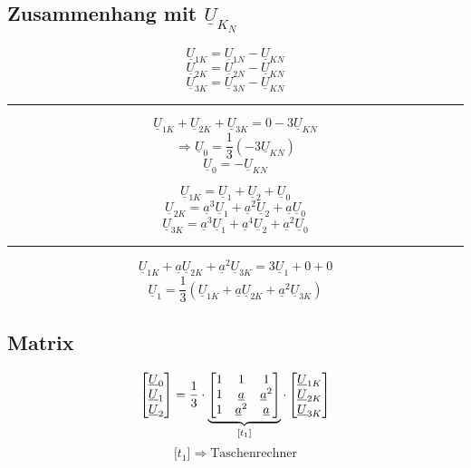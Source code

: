 \documentclass[a4,paper,fleqn]{article}
\begin{document}
\subsection{Zusammenhang mit $\underline{U}_{K_N}$}
\[ \underline{U}_{1K} = \underline{U}_{1N} - \underline{U}_{KN} \]
\[ \underline{U}_{2K} = \underline{U}_{2N} - \underline{U}_{KN} \]
\[ \underline{U}_{3K} = \underline{U}_{3N} - \underline{U}_{KN} \]
\rule{10cm}{0.5pt}
\[ \underline{U}_{1K} + \underline{U}_{2K} + \underline{U}_{3K} = 0 - 3 \underline{U}_{KN} \]
\[ \Rightarrow \underline{U}_{0} = \frac{1}{3} (-3 \underline{U}_{KN}) \]
\[ \boxed{\underline{U}_{0} = -\underline{U}_{KN}} \]

\[ \underline{U}_{1K} = \underline{U}_{1} + \underline{U}_{2} + \underline{U}_{0} \]
\[ \underline{U}_{2K} = \underline{a}^3 \underline{U}_{1} + \underline{a}^2 \underline{U}_{2} + \underline{a} \underline{U}_{0} \]
\[ \underline{U}_{3K} = \underline{a}^3 \underline{U}_{1} + \underline{a}^4 \underline{U}_{2} + \underline{a}^2 \underline{U}_{0} \]
\rule{10cm}{0.5pt}
\[ \underline{U}_{1K} + \underline{a} \underline{U}_{2K} + \underline{a}^2 \underline{U}_{3K} = 3 \underline{U}_{1} + 0 + 0 \]
\[ \boxed{\underline{U}_{1} = \frac{1}{3} \left(\underline{U}_{1K} + \underline{a} \underline{U}_{2K} + \underline{a}^2 \underline{U}_{3K}\right)} \]

\subsection{Matrix}
\[
\left\lbrack
    \begin{array}{@{}l@{}}
        \underline{U}_{0} \\
        \underline{U}_{1} \\
        \underline{U}_{2} \\
    \end{array}
\right\rbrack
=
\frac{1}{3} \cdot
\underbrace{
    \left\lbrack
        \begin{array}{@{}ccc@{}}
            1 & 1               & 1               \\
            1 & \underline{a}   & \underline{a}^2 \\
            1 & \underline{a}^2 & \underline{a}   \\
        \end{array}
    \right\rbrack
}_{\lbrack t_1 \rbrack}
\cdot
\left\lbrack
    \begin{array}{@{}l@{}}
        \underline{U}_{1K} \\
        \underline{U}_{2K} \\
        \underline{U}_{3K} \\
    \end{array}
\right\rbrack
\]
\[ \lbrack t_1 \rbrack \Rightarrow \text{Taschenrechner} \]
\end{document}
